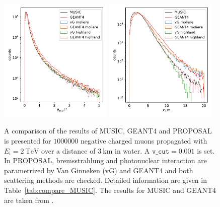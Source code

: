 \begin{figure}
    \centering
        {\includegraphics[width=0.48\textwidth]{figures/compare_MUSIC_angle_paper.pdf}}
        {\includegraphics[width=0.48\textwidth]{figures/compare_MUSIC_dist_paper.pdf}}
    \caption{A comparison of the results of MUSIC, GEANT4 and PROPOSAL is presented for $\num{1000000}$ negative charged muons propagated with 
    $E_{\text{i}} = \SI{2}{\tera\electronvolt}$ over a distance of 
    $\SI{3}{\kilo\meter}$ in water. A $\texttt{v\_cut} = 0.001$ is set. In PROPOSAL, 
    bremsstrahlung and photonuclear interaction are parametrized by 
    Van Ginneken (vG) and GEANT4 and both scattering methods are checked. Detailed information are given in 
    Table~\ref{tab:compare_MUSIC}. The results for MUSIC and GEANT4 are taken from 
    \cite{comparison_MUSIC_GEANT4_2009}.}
    \label{fig:compare_MUSIC}
\end{figure}



